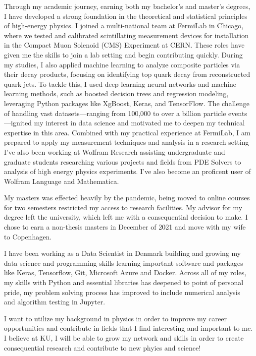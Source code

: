 \documentclass[11pt,a4]{article}
\begin{document}
Through my academic journey, earning both my bachelor’s and master’s degrees, I have developed a strong foundation in the theoretical and statistical principles of high-energy physics. 
I joined a multi-national team at FermiLab in Chicago, where we tested and calibrated scintillating measurement devices for installation in the Compact Muon Solenoid (CMS) Experiment at CERN. These roles have given me the skills to join a lab setting and begin contributing quickly. During my studies, I also applied machine learning to analyze composite particles via their decay products, focusing on identifying top quark decay from reconstructed quark jets. To tackle this, I used deep learning neural networks and machine learning methods, such as boosted decision trees and regression modeling, leveraging Python packages like XgBoost, Keras, and TensorFlow. The challenge of handling vast datasets—ranging from 100,000 to over a billion particle events—ignited my interest in data science and motivated me to deepen my technical expertise in this area. Combined with my practical experience at FermiLab, I am prepared to apply my measurement techniques and
analysis in a research setting I’ve also been working at Wolfram Research assisting undergraduate and graduate students researching various projects and fields from PDE Solvers to analysis of high energy physics experiments. I’ve also become an proficent user of Wolfram Language and Mathematica. 

My masters was effected heavily by the pandemic, being moved to online courses for two semesters restricted my access to
research facilities. My advisor for my degree left the university, which left me with a consequential decision to make. I chose to earn a non-thesis masters in December of 2021 and move with my wife to Copenhagen. 

I have been working as a Data Scientist in Denmark building and growing my data science and programming skills learning important software and packages like Keras, Tensorflow, Git, Microsoft Azure and Docker. 
Across all of my roles, my skills with Python and essential libraries has deepened to point of personal pride, my problem solving process has improved to include numerical analysis and algorithm testing in Jupyter.

I want to utilize my background in physics in order to improve my career opportunities and contribute in fields that I find
interesting and important to me. I believe at KU, I will be able to grow my network and skills in order to create consequential research and contribute to new phyics and science!
\end{document}
